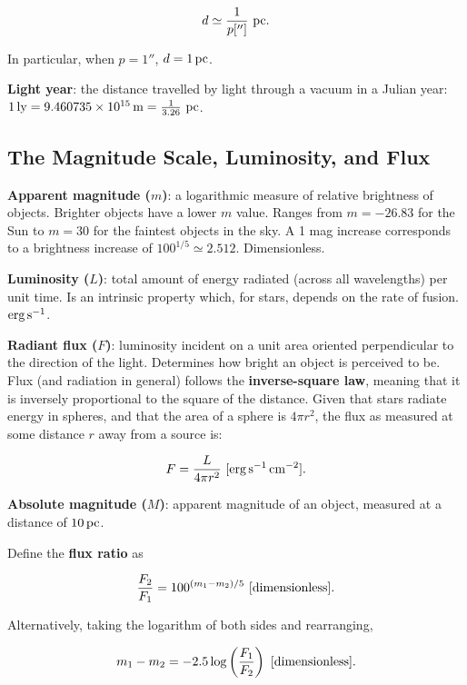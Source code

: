 \documentclass[a4paper,10pt]{article}
\begin{document}
\begin{align*}
    d \simeq \frac{1}{p['']} ~ {\rm pc}.
\end{align*}

In particular, when $p = 1''$, $d = 1\,{\rm pc}$.

\textbf{Light year}: the distance travelled by light through a vacuum in a Julian year: $1\,{\rm ly} = 9.460735\times 10^{15}\,{\rm m} = \frac{1}{3.26}~{\rm pc}$.

\subsection{The Magnitude Scale, Luminosity, and Flux}

\textbf{Apparent magnitude ($m$)}: a logarithmic measure of relative brightness of objects. Brighter objects have a lower $m$ value. Ranges from $m=-26.83$ for the Sun to $m=30$ for the faintest objects in the sky. A 1 mag increase corresponds to a brightness increase of $100^{1/5} \simeq 2.512$. Dimensionless. 

\textbf{Luminosity ($L$)}: total amount of energy radiated (across all wavelengths) per unit time. Is an intrinsic property which, for stars, depends on the rate of fusion. $\rm erg\,s^{-1}$. 

\textbf{Radiant flux ($F$)}: luminosity incident on a unit area oriented perpendicular to the direction of the light. Determines how bright an object is perceived to be. Flux (and radiation in general) follows the \textbf{inverse-square law}, meaning that it is inversely proportional to the square of the distance. Given that stars radiate energy in spheres, and that the area of a sphere is $4\pi r^2$, the flux as measured at some distance $r$ away from a source is:

\begin{align*}
    F = \frac{L}{4\pi r^2}~[{\rm erg\,s^{-1}\,cm^{-2}}].
\end{align*}

\textbf{Absolute magnitude ($M$)}: apparent magnitude of an object, measured at a distance of $10\,{\rm pc}$.

Define the \textbf{flux ratio} as 

\begin{align*}
    \frac{F_2}{F_1} = 100^{(m_1-m_2)/5}~[{\rm dimensionless}].
\end{align*}

Alternatively, taking the logarithm of both sides and rearranging, 

\begin{align*}
    m_1 - m_2 = -2.5\log\left(\frac{F_1}{F_2}\right)~[{\rm dimensionless}].
\end{align*}
\end{document}

